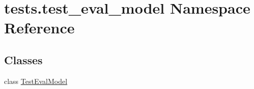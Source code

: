 \hypertarget{namespacetests_1_1test__eval__model}{}\section{tests.\+test\+\_\+eval\+\_\+model Namespace Reference}
\label{namespacetests_1_1test__eval__model}
\subsection*{Classes}
\begin{DoxyCompactItemize}
\item 
class \hyperlink{classtests_1_1test__eval__model_1_1TestEvalModel}{Test\+Eval\+Model}
\end{DoxyCompactItemize}
